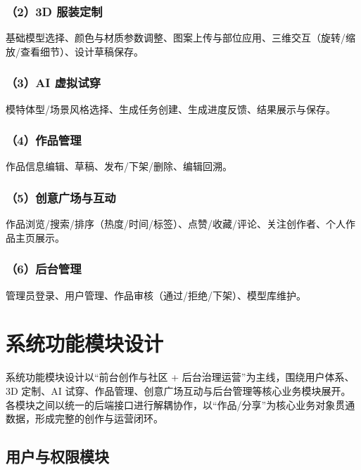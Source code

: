 \documentclass[twoside]{thesis-cls-Miya} %
\begin{document}
\subsubsection*{（2）3D 服装定制}
基础模型选择、颜色与材质参数调整、图案上传与部位应用、三维交互（旋转/缩放/查看细节）、设计草稿保存。

\subsubsection*{（3）AI 虚拟试穿}
模特体型/场景风格选择、生成任务创建、生成进度反馈、结果展示与保存。

\subsubsection*{（4）作品管理}
作品信息编辑、草稿、发布/下架/删除、编辑回溯。

\subsubsection*{（5）创意广场与互动}
作品浏览/搜索/排序（热度/时间/标签）、点赞/收藏/评论、关注创作者、个人作品主页展示。

\subsubsection*{（6）后台管理}
管理员登录、用户管理、作品审核（通过/拒绝/下架）、模型库维护。

\section{系统功能模块设计}

系统功能模块设计以“前台创作与社区 + 后台治理运营”为主线，围绕用户体系、3D 定制、AI 试穿、作品管理、创意广场互动与后台管理等核心业务模块展开。各模块之间以统一的后端接口进行解耦协作，以“作品/分享”为核心业务对象贯通数据，形成完整的创作与运营闭环。

\begingroup
\setlength{\textfloatsep}{10pt plus 2pt minus 2pt}
\setlength{\intextsep}{10pt plus 2pt minus 2pt}
\setlength{\abovecaptionskip}{6pt}
\setlength{\belowcaptionskip}{0pt}

\subsection{用户与权限模块}
\end{document}

